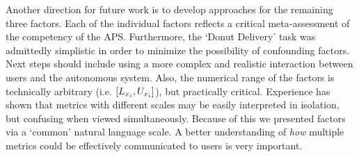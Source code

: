 Another direction for future work is to develop approaches for the remaining three \famsec{} factors. Each of the individual factors reflects a critical meta-assessment of the competency of the APS. Furthermore, the `Donut Delivery' task was admittedly simplistic in order to minimize the possibility of confounding factors. Next steps should include using a more complex and realistic interaction between users and the autonomous system. Also, the numerical range of the \famsec{} factors is technically arbitrary (i.e. $[L_{x_i},U_{x_i}]$), but practically critical. Experience has shown that metrics with different scales may be easily interpreted in isolation, but confusing when viewed simultaneously. Because of this we presented factors via a `common' natural language scale. A better understanding of \emph{how} multiple metrics could be effectively communicated to users is very important. %
